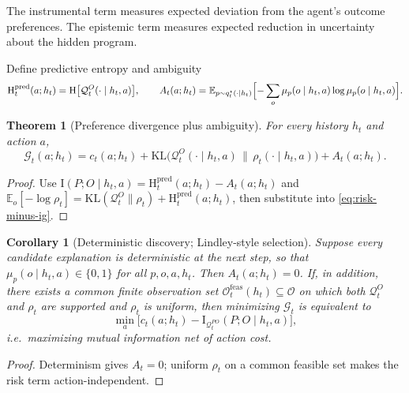\documentclass[11pt]{article}
\newtheorem{theorem}[definition]{Theorem}
\newtheorem{corollary}[definition]{Corollary}
\theoremstyle{remark}
\newcommand{\Ocal}{\mathcal{O}}
\newcommand{\Gcal}{\mathcal{G}}
\newcommand{\Qcal}{\mathcal{Q}}
\newcommand{\E}{\mathbb{E}}
\newcommand{\KL}{\mathrm{KL}}
\newcommand{\I}{\mathrm{I}}
\newcommand{\Hh}{\mathrm{H}}
\begin{document}
The instrumental term measures expected deviation from the agent's outcome preferences. The epistemic term measures expected reduction in uncertainty about the hidden program.

Define predictive entropy and ambiguity
\[
\Hh_t^{\mathrm{pred}}(a;h_t)
= \Hh\bigl[\Qcal_t^O(\cdot\mid h_t,a)\bigr],
\qquad
A_t(a;h_t)
= \E_{p\sim q_t^\star(\cdot\mid h_t)}
\Bigl[
-\sum_{o} \mu_p(o\mid h_t,a)\log \mu_p(o\mid h_t,a)
\Bigr].
\]

\begin{theorem}[Preference divergence plus ambiguity]
For every history \(h_t\) and action \(a\),
\begin{equation}
\Gcal_t(a;h_t)
= c_t(a;h_t)
+ \KL\!\bigl(\Qcal_t^O(\cdot\mid h_t,a)\,\|\,\rho_t(\cdot\mid h_t,a)\bigr)
+ A_t(a;h_t).
\label{eq:preference-ambiguity}
\end{equation}
\end{theorem}

\begin{proof}
Use \(\I(P;O\mid h_t,a) = \Hh_t^{\mathrm{pred}}(a;h_t) - A_t(a;h_t)\) and \(\E_o[-\log \rho_t] = \KL(\Qcal_t^O\|\rho_t) + \Hh_t^{\mathrm{pred}}(a;h_t)\), then substitute into \eqref{eq:risk-minus-ig}.
\end{proof}

\begin{corollary}[Deterministic discovery; Lindley-style selection]
\label{cor:deterministic}
Suppose every candidate explanation is deterministic at the next step, so that \(\mu_p(o\mid h_t,a)\in\{0,1\}\) for all \(p,o,a,h_t\). Then \(A_t(a;h_t)=0\). If, in addition, there exists a common finite observation set \(\Ocal_t^{\mathrm{feas}}(h_t)\subseteq\Ocal\) on which both \(\Qcal_t^O\) and \(\rho_t\) are supported and \(\rho_t\) is uniform, then minimizing \(\Gcal_t\) is equivalent to
\[
\min_a \bigl[c_t(a;h_t) - \I_{\Qcal_t^{PO}}(P;O\mid h_t,a)\bigr],
\]
i.e.\ maximizing mutual information net of action cost.
\end{corollary}

\begin{proof}
Determinism gives \(A_t=0\); uniform \(\rho_t\) on a common feasible set makes the risk term action-independent.
\end{proof}
\end{document}
